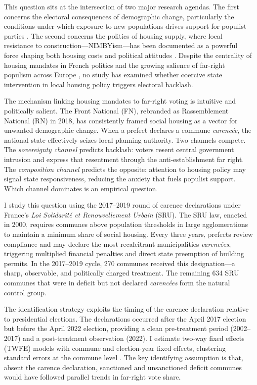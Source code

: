 \documentclass[12pt]{article}
\begin{document}
This question sits at the intersection of two major research agendas. The first concerns the electoral consequences of demographic change, particularly the conditions under which exposure to new populations drives support for populist parties \citep{fieldhouse2019, dustmann2019, barone2016, tabellini2020, halla2017}. The second concerns the politics of housing supply, where local resistance to construction---NIMBYism---has been documented as a powerful force shaping both housing costs and political attitudes \citep{glaeser2018, diamond2016, combes2018}. Despite the centrality of housing mandates in French politics and the growing salience of far-right populism across Europe \citep{guiso2019, norris2019}, no study has examined whether coercive state intervention in local housing policy triggers electoral backlash.

The mechanism linking housing mandates to far-right voting is intuitive and politically salient. The Front National (FN), rebranded as Rassemblement National (RN) in 2018, has consistently framed social housing as a vector for unwanted demographic change. When a prefect declares a commune \textit{caren\-c\'{e}e}, the national state effectively seizes local planning authority. Two channels compete. The \textit{sovereignty channel} predicts backlash: voters resent central government intrusion and express that resentment through the anti-establishment far right. The \textit{composition channel} predicts the opposite: attention to housing policy may signal state responsiveness, reducing the anxiety that fuels populist support. Which channel dominates is an empirical question.

I study this question using the 2017--2019 round of carence declarations under France's \textit{Loi Solidarit\'{e} et Renouvellement Urbain} (SRU). The SRU law, enacted in 2000, requires communes above population thresholds in large agglomerations to maintain a minimum share of social housing. Every three years, prefects review compliance and may declare the most recalcitrant municipalities \textit{caren\-c\'{e}es}, triggering multiplied financial penalties and direct state preemption of building permits. In the 2017--2019 cycle, 270 communes received this designation---a sharp, observable, and politically charged treatment. The remaining 634 SRU communes that were in deficit but not declared \textit{caren\-c\'{e}es} form the natural control group.

The identification strategy exploits the timing of the carence declaration relative to presidential elections. The declarations occurred after the April 2017 election but before the April 2022 election, providing a clean pre-treatment period (2002--2017) and a post-treatment observation (2022). I estimate two-way fixed effects (TWFE) models with commune and election-year fixed effects, clustering standard errors at the commune level \citep{callaway2021}. The key identifying assumption is that, absent the carence declaration, sanctioned and unsanctioned deficit communes would have followed parallel trends in far-right vote share.
\end{document}
